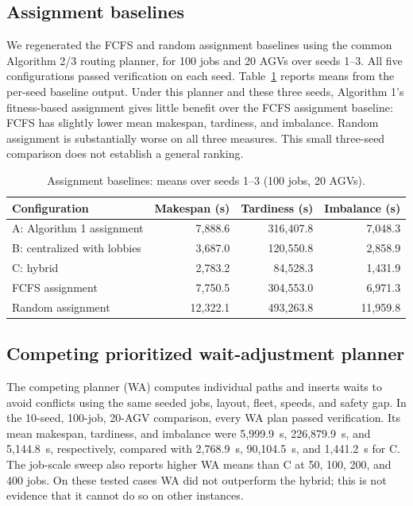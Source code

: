 \subsection{Assignment baselines}

We regenerated the FCFS and random assignment baselines using the common
Algorithm 2/3 routing planner, for 100 jobs and 20 AGVs over seeds 1--3. All
five configurations passed verification on each seed. Table~\ref{tab:assign}
reports means from the per-seed baseline output.
Under this planner and these three seeds, Algorithm 1's fitness-based
assignment gives little benefit over the FCFS assignment baseline: FCFS has
slightly lower mean makespan, tardiness, and imbalance. Random assignment is
substantially worse on all three measures. This small three-seed comparison
does not establish a general ranking.

\begin{table}[htbp]
\centering
\small
\caption{Assignment baselines: means over seeds 1--3 (100 jobs, 20 AGVs).}
\label{tab:assign}
\begin{tabular}{lrrr}
\toprule
Configuration & Makespan (s) & Tardiness (s) & Imbalance (s) \\
\midrule
A: Algorithm 1 assignment & 7,888.6 & 316,407.8 & 7,048.3 \\
B: centralized with lobbies & 3,687.0 & 120,550.8 & 2,858.9 \\
C: hybrid & 2,783.2 & 84,528.3 & 1,431.9 \\
FCFS assignment & 7,750.5 & 304,553.0 & 6,971.3 \\
Random assignment & 12,322.1 & 493,263.8 & 11,959.8 \\
\bottomrule
\end{tabular}
\end{table}

\subsection{Competing prioritized wait-adjustment planner}

The competing planner (WA) computes individual paths and inserts waits to
avoid conflicts using the same seeded jobs, layout, fleet, speeds, and safety
gap. In the 10-seed, 100-job, 20-AGV comparison, every WA plan passed
verification. Its mean makespan, tardiness, and imbalance were 5,999.9~s,
226,879.9~s, and 5,144.8~s, respectively, compared with 2,768.9~s,
90,104.5~s, and 1,441.2~s for C. The job-scale sweep also reports higher WA
means than C at 50, 100, 200, and 400 jobs. On these tested cases WA did not
outperform the hybrid; this is not evidence that it cannot do so on other
instances.

